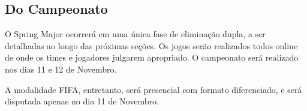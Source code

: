 \subsection{Do Campeonato}

O Spring Major ocorrerá em uma única fase de eliminação dupla, a ser detalhadas ao longo das próximas seções. Os jogos serão realizados todos online de onde os times e jogadores julgarem apropriado. O campeonato será realizado nos dias 11 e 12 de Novembro.

A modalidade FIFA, entretanto, será presencial com formato diferenciado, e será disputada apenas no dia 11 de Novembro.